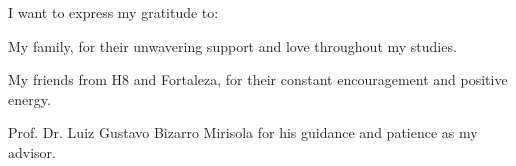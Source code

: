 I want to express my gratitude to:

My family, for their unwavering support and love throughout my studies.

My friends from H8 and Fortaleza, for their constant encouragement and positive energy.

Prof. Dr. Luiz Gustavo Bizarro Mirisola for his guidance and patience as my advisor.